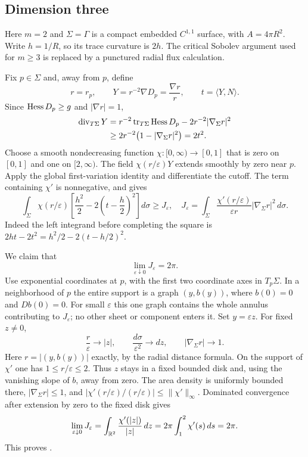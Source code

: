 \subsection{Dimension three}
Here $m=2$ and $\Sigma=\Gamma$ is a compact embedded $C^{1,1}$ surface,
with $A=4\pi R^2$. Write $h=1/R$, so its trace curvature is $2h$.
The critical Sobolev argument used for $m\ge3$ is replaced by a punctured
radial flux calculation.

Fix $p\in\Sigma$ and, away from $p$, define
\[
 r=r_p,\qquad Y=r^{-2}\nabla D_p=\frac{\nabla r}{r},
 \qquad t=\langle Y,N\rangle.
\]
Since $\operatorname{Hess} D_p\ge g$ and $|\nabla r|=1$,
\begin{align}
 \operatorname{div}_{T\Sigma}Y
 &=r^{-2}\operatorname{tr}_{T\Sigma}\operatorname{Hess} D_p
      -2r^{-2}|\nabla_\Sigma r|^2 \notag\\
 &\ge2r^{-2}\bigl(1-|\nabla_\Sigma r|^2\bigr)=2t^2.
 \label{eq:puncture-divergence}
\end{align}
Choose a smooth nondecreasing function $\chi:[0,\infty)\to[0,1]$
that is zero on $[0,1]$ and one on $[2,\infty)$.
The field $\chi(r/\varepsilon)Y$ extends smoothly by zero near $p$.
Apply the global first-variation identity and differentiate the cutoff.
The term containing $\chi'$ is nonnegative, and
 gives
\begin{equation}\label{eq:puncture-square}
 \int_\Sigma\chi(r/\varepsilon)
       \left[\frac{h^2}{2}-2\left(t-\frac h2\right)^2\right]d\sigma
 \ge J_\varepsilon,
 \quad
 J_\varepsilon=
 \int_\Sigma\frac{\chi'(r/\varepsilon)}{\varepsilon r}
                 |\nabla_\Sigma r|^2\,d\sigma.
\end{equation}
Indeed the left integrand before completing the square is
$2ht-2t^2=h^2/2-2(t-h/2)^2$.

We claim that
\begin{equation}\label{eq:annular-flux}
 \lim_{\varepsilon\downarrow0}J_\varepsilon=2\pi.
\end{equation}
Use exponential coordinates at $p$, with the first two coordinate axes
in $T_p\Sigma$. In a neighborhood of $p$ the entire support is a graph
$(y,b(y))$, where $b(0)=0$ and $Db(0)=0$.
For small $\varepsilon$ this one graph contains the whole annulus
contributing to $J_\varepsilon$; no other sheet or component enters it.
Set $y=\varepsilon z$. For fixed $z\ne0$,
\[
 \frac r\varepsilon\longrightarrow |z|,\qquad
 \frac{d\sigma}{\varepsilon^2}\longrightarrow dz,
 \qquad |\nabla_\Sigma r|\longrightarrow1.
\]
Here $r=|(y,b(y))|$ exactly, by the radial distance formula.
On the support of $\chi'$ one has $1\le r/\varepsilon\le2$.
Thus $z$ stays in a fixed bounded disk and, using the vanishing slope of
$b$, away from zero. The area density is uniformly bounded there,
$|\nabla_\Sigma r|\le1$, and
$|\chi'(r/\varepsilon)/(r/\varepsilon)|\le\|\chi'\|_\infty$.
Dominated convergence after extension by zero to the fixed disk gives
\[
 \lim_{\varepsilon\downarrow0}J_\varepsilon
 =\int_{\mathbb R^2}\frac{\chi'(|z|)}{|z|}\,dz
 =2\pi\int_1^2\chi'(s)\,ds=2\pi.
\]
This proves .

